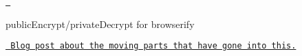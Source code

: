 \href{https://travis-ci.org/crypto-browserify/publicEncrypt}{\texttt{ }}

public\+Encrypt/private\+Decrypt for browserify

\href{http://calvinmetcalf.com/post/109301244759/porting-nodejs-crypto-to-the-browser-part-3}{\texttt{ Blog post about the moving parts that have gone into this.}} 